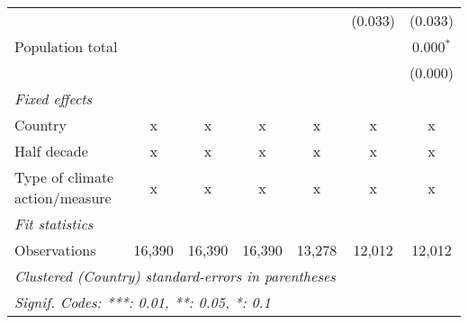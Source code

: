 \begin{tabular}{lcccccc}
                                                        &         &         &         &         & (0.033) & (0.033)\\   
   Population total                                     &         &         &         &         &         & 0.000$^{*}$\\   
                                                        &         &         &         &         &         & (0.000)\\   
   \emph{Fixed effects}\\
   Country                                              & x       & x       & x       & x       & x       & x\\  
   Half decade                                          & x       & x       & x       & x       & x       & x\\  
   Type of climate action/measure                       & x       & x       & x       & x       & x       & x\\  
   \midrule \emph{Fit statistics}\\
   Observations                                         & 16,390  & 16,390  & 16,390  & 13,278  & 12,012  & 12,012\\  
   \midrule
   \multicolumn{7}{l}{\emph{Clustered (Country) standard-errors in parentheses}}\\
   \multicolumn{7}{l}{\emph{Signif. Codes: ***: 0.01, **: 0.05, *: 0.1}}\\
\end{tabular}
\par\endgroup



